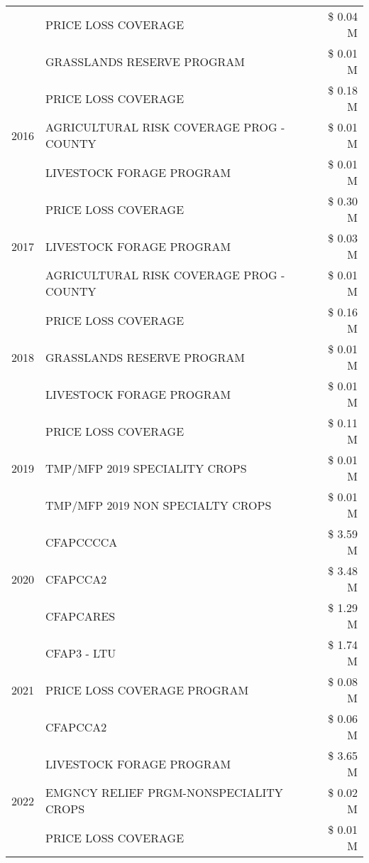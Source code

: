 \begin{tabular}{llr}
 & PRICE LOSS COVERAGE & \$ 0.04 M \\
 & GRASSLANDS RESERVE PROGRAM & \$ 0.01 M \\
\cline{1-3}
\multirow[t]{3}{*}{2016} & PRICE LOSS COVERAGE & \$ 0.18 M \\
 & AGRICULTURAL RISK COVERAGE PROG - COUNTY & \$ 0.01 M \\
 & LIVESTOCK FORAGE PROGRAM & \$ 0.01 M \\
\cline{1-3}
\multirow[t]{3}{*}{2017} & PRICE LOSS COVERAGE & \$ 0.30 M \\
 & LIVESTOCK FORAGE PROGRAM & \$ 0.03 M \\
 & AGRICULTURAL RISK COVERAGE PROG - COUNTY & \$ 0.01 M \\
\cline{1-3}
\multirow[t]{3}{*}{2018} & PRICE LOSS COVERAGE & \$ 0.16 M \\
 & GRASSLANDS RESERVE PROGRAM & \$ 0.01 M \\
 & LIVESTOCK FORAGE PROGRAM & \$ 0.01 M \\
\cline{1-3}
\multirow[t]{3}{*}{2019} & PRICE LOSS COVERAGE & \$ 0.11 M \\
 & TMP/MFP 2019 SPECIALITY CROPS & \$ 0.01 M \\
 & TMP/MFP 2019 NON SPECIALTY CROPS & \$ 0.01 M \\
\cline{1-3}
\multirow[t]{3}{*}{2020} & CFAPCCCCA & \$ 3.59 M \\
 & CFAPCCA2 & \$ 3.48 M \\
 & CFAPCARES & \$ 1.29 M \\
\cline{1-3}
\multirow[t]{3}{*}{2021} & CFAP3 - LTU & \$ 1.74 M \\
 & PRICE LOSS COVERAGE PROGRAM & \$ 0.08 M \\
 & CFAPCCA2 & \$ 0.06 M \\
\cline{1-3}
\multirow[t]{3}{*}{2022} & LIVESTOCK FORAGE PROGRAM & \$ 3.65 M \\
 & EMGNCY RELIEF PRGM-NONSPECIALITY CROPS & \$ 0.02 M \\
 & PRICE LOSS COVERAGE & \$ 0.01 M \\
\cline{1-3}
\bottomrule
\end{tabular}
